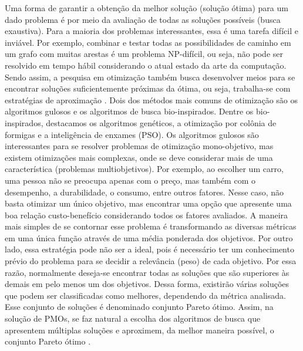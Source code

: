 Uma forma de garantir a obtenção da melhor solução (solução ótima) para um dado problema é por meio da avaliação de todas as soluções possíveis (busca exaustiva). Para a maioria dos problemas interessantes, essa é uma tarefa difícil e inviável. Por exemplo, combinar e testar todas as possibilidades de caminho em um grafo com muitas arestas é um problema NP-difícil, ou seja, não pode ser resolvido em tempo hábil considerando o atual estado da arte da computação. Sendo assim, a pesquisa em otimização também busca desenvolver meios para se encontrar soluções suficientemente próximas da ótima, ou seja, trabalha-se com estratégias de aproximação \cite{GreedyAlgorithms}. Dois dos métodos mais comuns de otimização são os algoritmos gulosos e os algoritmos de busca bio-inspirados. Dentre os bio-inspirados, destacamos os algoritmos genéticos, a otimização por colônia de formigas e a inteligência de enxames (PSO). Os algoritmos gulosos são interessantes para se resolver problemas de otimização mono-objetivo, mas existem otimizações mais complexas, onde se deve considerar mais de uma característica (problemas multiobjetivos). Por exemplo, ao escolher um carro, uma pessoa não se preocupa apenas com o preço, mas também com o desempenho, a durabilidade, o consumo, entre outros fatores. Nesse caso, não basta otimizar um único objetivo, mas encontrar uma opção que apresente uma boa relação custo-benefício considerando todos os fatores avaliados. A maneira mais simples de se contornar esse problema é transformando as diversas métricas em uma única função através de uma média ponderada dos objetivos. Por outro lado, essa estratégia pode não ser a ideal, pois é necessário ter um conhecimento prévio do problema para se decidir a relevância (peso) de cada objetivo. Por essa razão, normalmente deseja-se encontrar todas as soluções que são superiores às demais em pelo menos um dos objetivos. Dessa forma, existirão várias soluções que podem ser classificadas como
melhores, dependendo da métrica analisada. Esse conjunto de soluções é denominado conjunto Pareto ótimo. Assim, na solução de \acp{PMO}, se faz natural a escolha dos algoritmos de busca que apresentem múltiplas soluções e aproximem, da melhor maneira possível, o conjunto Pareto ótimo \cite{Srinivas1994}.


